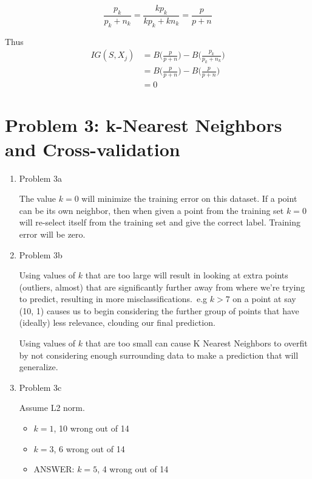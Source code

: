 \documentclass[11pt]{article}
\newenvironment{solution}{\color{blue}{\bf Solution:}}{}
\begin{document}
\begin{enumerate}
\begin{solution}
  \[
    \frac{p_k}{p_k + n_k} = \frac{kp_k}{kp_k + kn_k} = \frac{p}{p + n}
  \]

  Thus
  \begin{align*}
    IG(S,X_j) &= B\bigg(\frac{p}{p+n}\bigg) - B\bigg(\frac{p_k}{p_k+n_k}\bigg)\\
              &= B\bigg(\frac{p}{p+n}\bigg) - B\bigg(\frac{p}{p+n}\bigg)\\
              &= 0
  \end{align*}

\end{solution}

\end{enumerate}

\newpage
\section{Problem 3: k-Nearest Neighbors and Cross-validation}
\begin{enumerate}
  \item Problem 3a

  \begin{solution}
  The value $k = 0$ will minimize the training error on this dataset. If a point
  can be its own neighbor, then when given a point from the training set $k = 0$
  will re-select itself from the training set and give the correct label.
  Training error will be zero.
  \end{solution}

  \item Problem 3b

  \begin{solution}
  Using values of $k$ that are too large will result in looking at extra
  points (outliers, almost) that are significantly further away from where
  we're trying to predict, resulting in more misclassifications.\ e.g $k > 7$ on
  a point at say (10, 1) causes us to begin considering the further group of
  points that have (ideally) less relevance, clouding our final prediction.

  Using values of $k$ that are too small can cause K Nearest Neighbors to
  overfit by not considering enough surrounding data to make a prediction that
  will generalize.
  \end{solution}

  \item Problem 3c
    
  \begin{solution}
  Assume L2 norm.
  \begin{itemize}
    \item $k = 1$, 10 wrong out of 14
    \item $k = 3$, 6 wrong out of 14
    \item ANSWER: $k = 5$, 4 wrong out of 14
  \end{itemize}
  \end{solution}
\end{enumerate}
\end{document}
